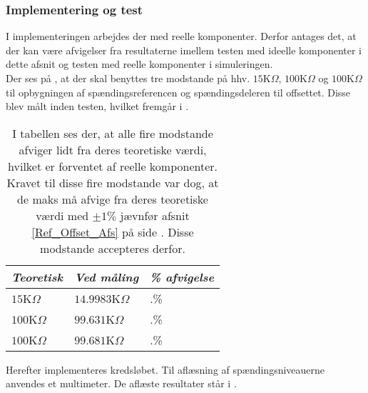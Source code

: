 \subsubsection{Implementering og test}
I implementeringen arbejdes der med reelle komponenter. Derfor antages det, at der kan være afvigelser fra resultaterne imellem testen med ideelle komponenter i dette afsnit og testen med reelle komponenter i simuleringen. \\
Der ses på , at der skal benyttes tre modstande på hhv. $15$K$\Omega$, $100$K$\Omega$ og $100$K$\Omega$ til opbygningen af spændingsreferencen og spændingsdeleren til offsettet. Disse blev målt inden testen, hvilket fremgår i .

\begin{table}[H]
	\centering
	\begin{tabular}{|l|l|l|}
		\hline
		\textit{Teoretisk} & \textit{Ved måling} & \textit{\% afvigelse} \\ \hline
		$15$K$\Omega$       & $14.9983$K$\Omega$   & $.$\%               \\ \hline
		$100$K$\Omega$      & $99.631$K$\Omega$    & $.$\%               \\ \hline
		$100$K$\Omega$      & $99.681$K$\Omega$    & $.$\%               \\ \hline
	\end{tabular}
	\caption{I tabellen ses der, at alle fire modstande afviger lidt fra deres teoretiske værdi, hvilket er forventet af reelle komponenter. Kravet til disse fire modstande var dog, at de maks må afvige fra deres teoretiske værdi med $\pm1\%$ jævnfør afsnit \ref{Ref_Offset_Afs} på side \pageref{Ref_Offset_Afs}. Disse modstande accepteres derfor.}
	\label{Tab:modstand_Kompar}
\end{table}
\noindent Herefter implementeres kredsløbet. Til aflæsning af spændingsniveauerne anvendes et multimeter. De aflæste resultater står i .
